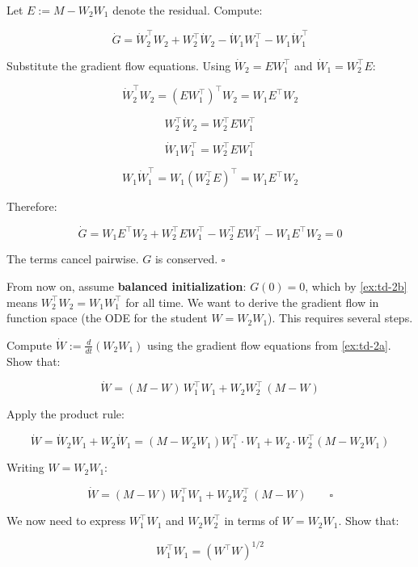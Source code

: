 \documentclass[11pt]{article}
\begin{document}
\begin{solution}[ex:td-2b]
Let \(E := M - W_2 W_1\) denote the residual. Compute:

\[\dot{G} = \dot{W}_2^\top W_2 + W_2^\top \dot{W}_2 - \dot{W}_1 W_1^\top - W_1 \dot{W}_1^\top\]

Substitute the gradient flow equations. Using \(\dot{W}_2 = E W_1^\top\)
and \(\dot{W}_1 = W_2^\top E\):

\[\dot{W}_2^\top W_2 = (E W_1^\top)^\top W_2 = W_1 E^\top W_2\]

\[W_2^\top \dot{W}_2 = W_2^\top E W_1^\top\]

\[\dot{W}_1 W_1^\top = W_2^\top E W_1^\top\]

\[W_1 \dot{W}_1^\top = W_1(W_2^\top E)^\top = W_1 E^\top W_2\]

Therefore:

\[\dot{G} = W_1 E^\top W_2 + W_2^\top E W_1^\top - W_2^\top E W_1^\top - W_1 E^\top W_2 = 0\]

The terms cancel pairwise. \(G\) is conserved. \(\square\)
\end{solution}

From now on, assume \textbf{balanced initialization}:
\(G(0) = 0\), which by \cref{ex:td-2b} means \(W_2^\top W_2 = W_1 W_1^\top\)
for all time. We want to derive the gradient flow in function space (the
ODE for the student \(W = W_2 W_1\)). This requires several steps.

\begin{exercise}
\label{ex:td-2ci}
Compute \(\dot{W} := \frac{d}{dt}(W_2 W_1)\) using the
gradient flow equations from \cref{ex:td-2a}. Show that:

\[\dot{W} = (M - W)\, W_1^\top W_1 + W_2 W_2^\top\, (M - W)\]
\end{exercise}

\begin{solution}[ex:td-2ci]
Apply the product rule:

\[\dot{W} = \dot{W}_2 W_1 + W_2 \dot{W}_1 = (M - W_2 W_1)W_1^\top \cdot W_1 + W_2 \cdot W_2^\top(M - W_2 W_1)\]

Writing \(W = W_2 W_1\):

\[\dot{W} = (M - W)\,W_1^\top W_1 + W_2 W_2^\top\,(M - W) \qquad \square\]
\end{solution}

\begin{exercise}
\label{ex:td-2cii}
We now need to express \(W_1^\top W_1\) and
\(W_2 W_2^\top\) in terms of \(W = W_2 W_1\). Show that:

\[W_1^\top W_1 = (W^\top W)^{1/2}\]
\end{exercise}
\end{document}
